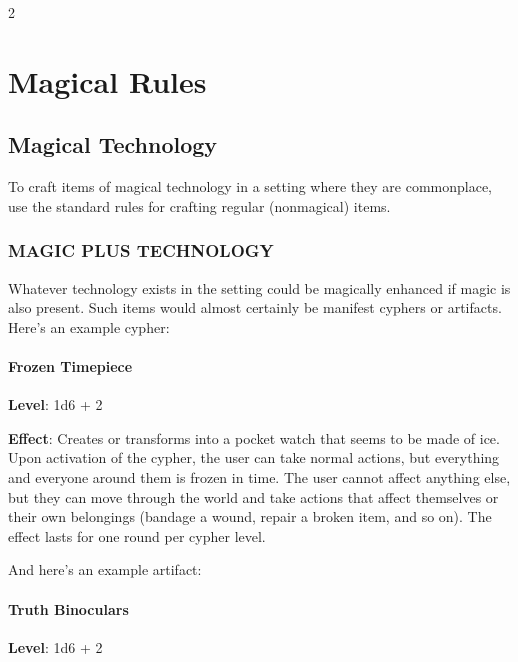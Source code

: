 \begin{multicols}{2}

\chapter{Magical Rules}

\section{Magical Technology}

To craft items of magical technology in a setting where they are commonplace, use the standard rules for crafting regular (nonmagical) items.

\subsection{MAGIC PLUS TECHNOLOGY}

Whatever technology exists in the setting could be magically enhanced if magic is also present. Such items would almost certainly be manifest cyphers or artifacts. Here’s an example cypher:

\subsubsection{Frozen Timepiece}

\textbf{Level}: 1d6 + 2

\textbf{Effect}: Creates or transforms into a pocket watch that seems to be made of ice. Upon activation of the cypher, the user can take normal actions, but everything and everyone around them is frozen in time. The user cannot affect anything else, but they can move through the world and take actions that affect themselves or their own belongings (bandage a wound, repair a broken item, and so on). The effect lasts for one round per cypher level.

And here’s an example artifact:

\subsubsection{Truth Binoculars}

\textbf{Level}: 1d6 + 2


\end{multicols}
